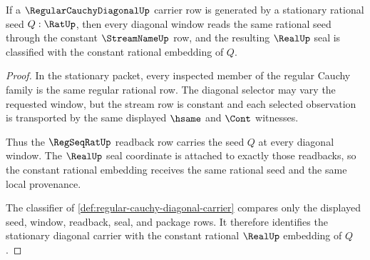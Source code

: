 \begin{theorem}
\label{thm:regular-cauchy-diagonal-stationary-compatibility}
If a $\RegularCauchyDiagonalUp$ carrier row is generated by a stationary rational seed $Q:\RatUp$, then every diagonal window reads the same rational seed through the constant $\StreamNameUp$ row, and the resulting $\RealUp$ seal is classified with the constant rational embedding of $Q$.
\end{theorem}
\begin{proof}
In the stationary packet, every inspected member of the regular Cauchy family is the same regular rational row. The diagonal selector may vary the requested window, but the stream row is constant and each selected observation is transported by the same displayed $\hsame$ and $\Cont$ witnesses.

Thus the $\RegSeqRatUp$ readback row carries the seed $Q$ at every diagonal window. The $\RealUp$ seal coordinate is attached to exactly those readbacks, so the constant rational embedding receives the same rational seed and the same local provenance.

The classifier of \autoref{def:regular-cauchy-diagonal-carrier} compares only the displayed seed, window, readback, seal, and package rows. It therefore identifies the stationary diagonal carrier with the constant rational $\RealUp$ embedding of $Q$.
\end{proof}

